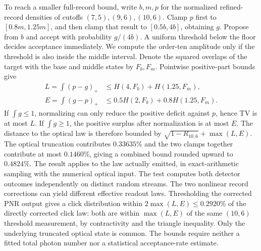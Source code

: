 \documentclass[11pt]{article}
\begin{document}
To reach a smaller full-record bound, write $b,m,p$ for the normalized refined-record densities of cutoffs $(7,5),(9,6),(10,6)$. Clamp $p$ first to $[0.8m,1.25m]$, and then clamp that result to $[0.5b,4b]$, obtaining $g$. Propose from $b$ and accept with probability $g/(4b)$. A uniform threshold below the floor decides acceptance immediately. We compute the order-ten amplitude only if the threshold is also inside the middle interval. Denote the squared overlaps of the target with the base and middle states by $F_b,F_m$. Pointwise positive-part bounds give
\begin{align*}
 L=\int(p-g)_+ &\le H(4,F_b)+H(1.25,F_m),\\
 E=\int(g-p)_+ &\le 0.5 H(2,F_b)+0.8 H(1.25,F_m).
\end{align*}
If $\int g\le1$, normalizing can only reduce the positive deficit against $p$, hence TV is at most $L$. If $\int g\ge1$, the positive surplus after normalization is at most $E$. The distance to the optical law is therefore bounded by $\sqrt{1-R_{10,6}}+\max(L,E)$. The optical truncation contributes $0.33635\%$ and the two clamps together contribute at most $0.1460\%$, giving a combined bound rounded upward to $0.4824\%$. The result applies to the law actually emitted, in exact-arithmetic sampling with the numerical optical input. The test computes both detector outcomes independently on distinct random streams. The two nonlinear record corrections can yield different effective readout laws. Thresholding the corrected PNR output gives a click distribution within $2\max(L,E)\le 0.2920\%$ of the directly corrected click law: both are within $\max(L,E)$ of the same $(10,6)$ threshold measurement, by contractivity and the triangle inequality. Only the underlying truncated optical state is common. The bounds require neither a fitted total photon number nor a statistical acceptance-rate estimate.
\end{document}
